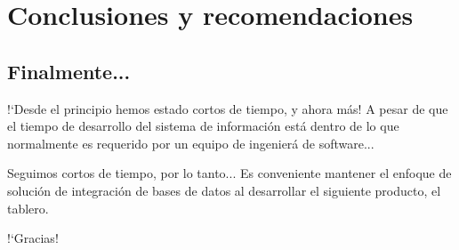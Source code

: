 \documentclass[xcolor=table, aspectratio=169]{beamer}
\begin{document}
\section{Conclusiones y recomendaciones}

\subsection{Finalmente...}

\begin{frame}[t]{!`Desde el principio hemos estado cortos de tiempo, y ahora m\'as!}
    A pesar de que el tiempo de desarrollo del sistema de informaci\'on est\'a dentro de lo que normalmente es requerido por un equipo de ingenier\'a de software...
    
	\begin{block}{Seguimos cortos de tiempo, por lo tanto...}
		Es conveniente mantener el enfoque de soluci\'on de integraci\'on de bases de datos al desarrollar el siguiente producto, el tablero.
	\end{block}
\end{frame}

\begin{frame}[plain, c]
	\begin{center}
		\Huge !`Gracias!
	\end{center}
\end{frame}
\end{document}
